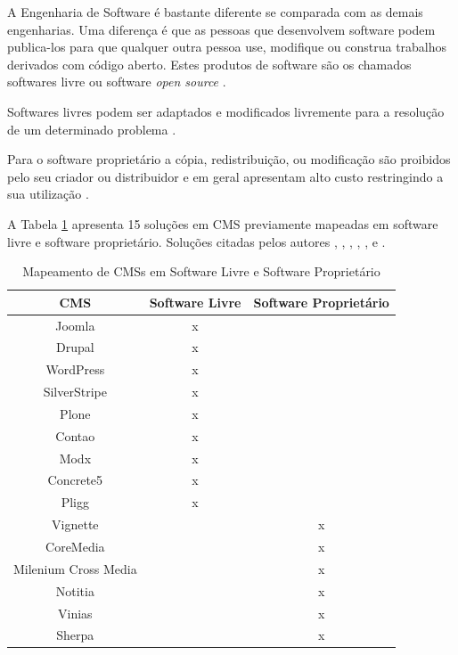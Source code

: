 A Engenharia de Software é bastante diferente se comparada com as demais engenharias. Uma diferença é que as pessoas que desenvolvem software podem publica-los para que qualquer outra pessoa use, modifique ou construa trabalhos derivados com código aberto. Estes produtos de software são os chamados softwares livre ou software \textit{open source} \cite{Yoshi}.

Softwares livres podem ser adaptados e modificados livremente para a resolução de um determinado problema \cite{aguiar2007}.

Para o software proprietário a cópia, redistribuição, ou modificação são proibidos pelo seu criador ou distribuidor e em geral apresentam alto custo restringindo a sua utilização \cite{aguiar2007}.

A Tabela \ref{tipos_CMS} apresenta 15 soluções em CMS previamente mapeadas em software livre e software proprietário. Soluções citadas pelos autores ,    , , , ,  e .




\begin{longtable}{|c|c|c|}
\caption{Mapeamento de CMSs em Software Livre e Software Proprietário}  \label{tipos_CMS}\\
 	\hline
\textbf{CMS} & \textbf{Software Livre} & \textbf{Software Proprietário}\\\hline
Joomla & x & \\\hline
Drupal & x & \\\hline
WordPress & x & \\\hline
SilverStripe & x & \\\hline
Plone & x & \\\hline
Contao & x & \\\hline
Modx & x & \\\hline
Concrete5 & x & \\\hline
Pligg & x & \\\hline
Vignette &  & x\\\hline
CoreMedia &  & x\\\hline
Milenium Cross Media &  & x\\\hline
Notitia &  & x\\\hline
Vinias &  & x\\\hline
Sherpa &  & x\\\hline
\end{longtable}

